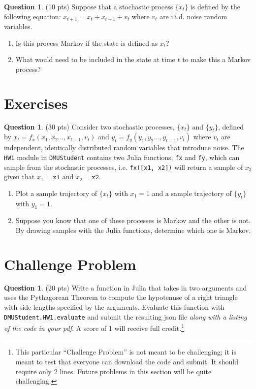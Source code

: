 \documentclass{article}
\theoremstyle{definition}
\newtheorem{question}[thm]{Question}
\begin{document}
\begin{question} (10 pts)
    Suppose that a stochastic process $\{x_t\}$ is defined by the following equation: $x_{t+1} = x_t + x_{t-1} + v_{t}$ where $v_t$ are i.i.d. noise random variables.
    \begin{enumerate}[label=(\alph*)]
        \item Is this process Markov if the state is defined as $x_t$?
        \item What would need to be included in the state at time $t$ to make this a Markov process?
    \end{enumerate}
\end{question}

\section{Exercises}

\begin{question} (30 pts)
    Consider two stochastic processes, $\{x_t\}$ and $\{y_t\}$, defined by $x_t = f_x(x_{1}, x_{2}... , x_{t-1}, v_t)$ and $y_t = f_y(y_{1}, y_{2}... , y_{t-1}, v_t)$ where $v_t$ are independent, identically distributed random variables that introduce noise. The \texttt{HW1} module in \texttt{DMUStudent} contains two Julia functions, \texttt{fx} and \texttt{fy}, which can sample from the stochastic processes, i.e. \texttt{fx([x1, x2])} will return a sample of $x_3$ given that $x_1 = \texttt{x1}$ and $x_2 = \texttt{x2}$.

    \begin{enumerate}[label=\alph*)]
        \item Plot a sample trajectory of $\{x_t\}$ with $x_1=1$ and a sample trajectory of $\{y_t\}$ with $y_1=1$.
        \item Suppose you know that one of these processes is Markov and the other is not. By drawing samples with the Julia functions, determine which one is Markov.
    \end{enumerate}
\end{question}

\section{Challenge Problem}

\begin{question} (20 pts)
    Write a function in Julia that takes in two arguments and uses the Pythagorean Theorem to compute the hypotenuse of a right triangle with side lengths specified by the arguments. Evaluate this function with \texttt{DMUStudent.HW1.evaluate} and submit the resulting json file \textit{along with a listing of the code in your pdf}. A score of 1 will receive full credit.\footnote{This particular ``Challenge Problem'' is not meant to be challenging; it is meant to test that everyone can download the code and submit. It should require only 2 lines. Future problems in this section will be quite challenging.}
\end{question}
\end{document}
